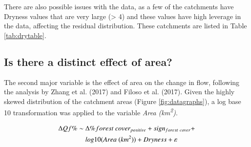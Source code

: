 \documentclass[]{elsarticle} %
\begin{document}
There are also possible issues with the data, as a few of the catchments have Dryness values that are very large (\textgreater{} 4) and these values have high leverage in the data, affecting the residual distribution. These catchments are listed in Table \ref{tab:drytable}.

\hypertarget{is-there-a-distinct-effect-of-area}{%
\subsection{Is there a distinct effect of area?}\label{is-there-a-distinct-effect-of-area}}

The second major variable is the effect of area on the change in flow, following the analysis by Zhang et al. (2017) and Filoso et al. (2017). Given the highly skewed distribution of the catchment areas (Figure \ref{fig:datagraphs}), a log base 10 transformation was applied to the variable \emph{Area (km\textsuperscript{2})}.

\begin{align}
\Delta Qf \% \sim ~ & \Delta \% forest~cover_{positive} + sign_{forest~cover} + \notag \\ & log10(Area ~(km^2)) + Dryness + \varepsilon \label{eq:eq6}
\end{align}
\end{document}
